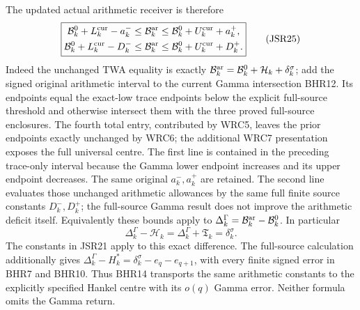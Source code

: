 \documentclass[11pt,a4paper]{article}
\begin{document}
The updated actual arithmetic receiver is therefore
\[
\boxed{\begin{aligned}
 \mathcal B_k^0+L_k^{\rm cur}-a_k^-
 &\leq\mathcal B_k^{\rm ar}
 \leq\mathcal B_k^0+U_k^{\rm cur}+a_k^+,\\
 \mathcal B_k^0+L_k^{\rm cur}-D_k^-
 &\leq\mathcal B_k^{\rm ar}
 \leq\mathcal B_k^0+U_k^{\rm cur}+D_k^+.
\end{aligned}}\tag{JSR25}
\]
Indeed the unchanged TWA equality is exactly
$\mathcal B_k^{\rm ar}=\mathcal B_k^0+
\mathcal H_k+\delta_k^\sigma$; add the signed original
arithmetic interval to the current Gamma intersection BHR12.
Its endpoints equal the exact-low trace endpoints below
the explicit full-source threshold and otherwise intersect
them with the three proved full-source enclosures.
The fourth total entry, contributed by WRC5, leaves
the prior endpoints exactly unchanged by WRC6; the
additional WRC7 presentation exposes the full universal centre.
The first line is contained in the preceding trace-only
interval because the Gamma lower endpoint increases and
its upper endpoint decreases. The same original
$a_k^-,a_k^+$ are retained. The second line evaluates
those unchanged arithmetic allowances by the same full
finite source constants $D_k^-,D_k^+$; the full-source
Gamma result does not improve the arithmetic deficit itself.
Equivalently these bounds apply to
$\Delta_k^\Gamma=\mathcal B_k^{\rm ar}-\mathcal B_k^0$.
In particular
\[
 \Delta_k^\Gamma-\mathcal H_k
 =\Delta_k^\Gamma+\mathfrak T_k=\delta_k^\sigma.
 \tag{JSR26}
\]
The constants in JSR21 apply to this exact difference.
The full-source calculation additionally gives
$\Delta_k^\Gamma-H_k^*=\delta_k^\sigma-e_q-e_{q+1}$,
with every finite signed error in BHR7 and BHR10.
Thus BHR14 transports the same arithmetic constants to
the explicitly specified Hankel centre with its $o(q)$
Gamma error. Neither formula omits the Gamma return.
\end{document}
